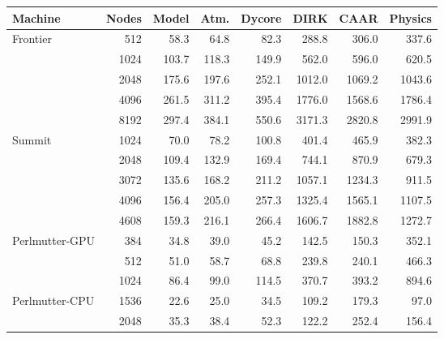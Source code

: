 \begin{tabular}{lr|rrrrrr}
Machine & Nodes & Model & Atm. & Dycore & DIRK & CAAR & Physics \\
\hline
Frontier & 512 & 58.3 & 64.8 & 82.3 & 288.8 & 306.0 & 337.6 \\
 & 1024 & 103.7 & 118.3 & 149.9 & 562.0 & 596.0 & 620.5 \\
 & 2048 & 175.6 & 197.6 & 252.1 & 1012.0 & 1069.2 & 1043.6 \\
 & 4096 & 261.5 & 311.2 & 395.4 & 1776.0 & 1568.6 & 1786.4 \\
 & 8192 & 297.4 & 384.1 & 550.6 & 3171.3 & 2820.8 & 2991.9 \\
\hline
Summit & 1024 & 70.0 & 78.2 & 100.8 & 401.4 & 465.9 & 382.3 \\
 & 2048 & 109.4 & 132.9 & 169.4 & 744.1 & 870.9 & 679.3 \\
 & 3072 & 135.6 & 168.2 & 211.2 & 1057.1 & 1234.3 & 911.5 \\
 & 4096 & 156.4 & 205.0 & 257.3 & 1325.4 & 1565.1 & 1107.5 \\
 & 4608 & 159.3 & 216.1 & 266.4 & 1606.7 & 1882.8 & 1272.7 \\
\hline
Perlmutter-GPU & 384 & 34.8 & 39.0 & 45.2 & 142.5 & 150.3 & 352.1 \\
 & 512 & 51.0 & 58.7 & 68.8 & 239.8 & 240.1 & 466.3 \\
 & 1024 & 86.4 & 99.0 & 114.5 & 370.7 & 393.2 & 894.6 \\
\hline
Perlmutter-CPU & 1536 & 22.6 & 25.0 & 34.5 & 109.2 & 179.3 & 97.0 \\
 & 2048 & 35.3 & 38.4 & 52.3 & 122.2 & 252.4 & 156.4 \\
\end{tabular}
